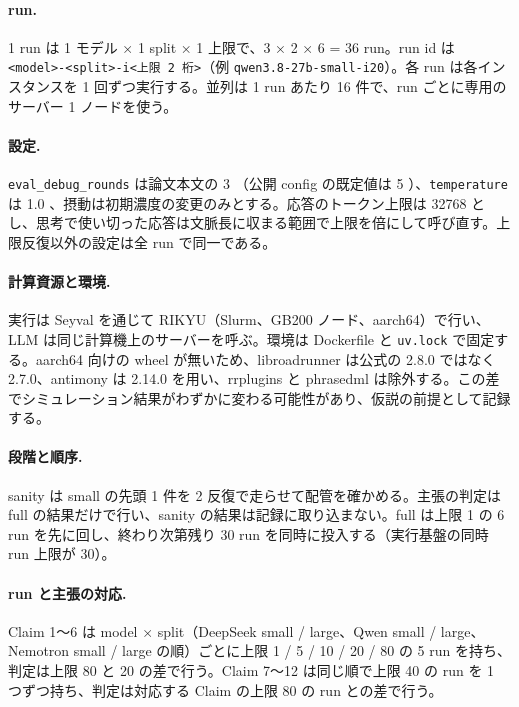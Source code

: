 \documentclass{article}
\begin{document}
\paragraph{run.}
1 run は 1 モデル × 1 split × 1 上限で、3 × 2 × 6 = 36 run。run id は \texttt{<model>-<split>-i<上限 2 桁>}（例 \texttt{qwen3.8-27b-small-i20}）。各 run は各インスタンスを 1 回ずつ実行する。並列は 1 run あたり 16 件で、run ごとに専用のサーバー 1 ノードを使う。

\paragraph{設定.}
\texttt{eval\_debug\_rounds} は論文本文の 3 \cite[s1.p4]{duan-2025-measuring}（公開 config の既定値は 5 \cite[s2.p3]{h4duan-2025-scigym}）、\texttt{temperature} は 1.0 \cite[s2.p1]{h4duan-2025-scigym}、摂動は初期濃度の変更のみとする。応答のトークン上限は 32768 とし、思考で使い切った応答は文脈長に収まる範囲で上限を倍にして呼び直す。上限反復以外の設定は全 run で同一である。

\paragraph{計算資源と環境.}
実行は Seyval を通じて RIKYU（Slurm、GB200 ノード、aarch64）で行い、LLM は同じ計算機上のサーバーを呼ぶ。環境は Dockerfile と \texttt{uv.lock} で固定する。aarch64 向けの wheel が無いため、libroadrunner は公式の 2.8.0 ではなく 2.7.0、antimony は 2.14.0 を用い、rrplugins と phrasedml は除外する。この差でシミュレーション結果がわずかに変わる可能性があり、仮説の前提として記録する。

\paragraph{段階と順序.}
sanity は small の先頭 1 件を 2 反復で走らせて配管を確かめる。主張の判定は full の結果だけで行い、sanity の結果は記録に取り込まない。full は上限 1 の 6 run を先に回し、終わり次第残り 30 run を同時に投入する（実行基盤の同時 run 上限が 30）。

\paragraph{run と主張の対応.}
Claim 1〜6 は model × split（DeepSeek small / large、Qwen small / large、Nemotron small / large の順）ごとに上限 1 / 5 / 10 / 20 / 80 の 5 run を持ち、判定は上限 80 と 20 の差で行う。Claim 7〜12 は同じ順で上限 40 の run を 1 つずつ持ち、判定は対応する Claim の上限 80 の run との差で行う。
\end{document}
